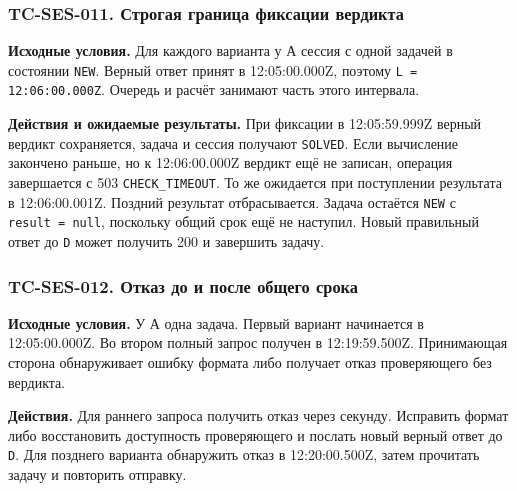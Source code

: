 \documentclass[12pt,a4paper]{article}
\begin{document}
\subsubsection{TC-SES-011. Строгая граница фиксации вердикта}\label{tc-ses-011-ux441ux442ux440ux43eux433ux430ux44f-ux433ux440ux430ux43dux438ux446ux430-ux444ux438ux43aux441ux430ux446ux438ux438-ux432ux435ux440ux434ux438ux43aux442ux430}

\hypertarget{tc-ses-011-строгая-граница-фиксации-вердикта}{}

\hypertarget{tc-ses-011}{}

\textbf{Исходные условия.} Для каждого варианта у А сессия с одной задачей в состоянии \texttt{NEW}. Верный ответ принят в 12:05:00.000Z, поэтому \texttt{L =\allowbreak{} 12:06:00.\allowbreak{}000Z}. Очередь и расчёт занимают часть этого интервала.

\textbf{Действия и ожидаемые результаты.} При фиксации в 12:05:59.999Z верный вердикт сохраняется, задача и сессия получают \texttt{SOLVED}. Если вычисление закончено раньше, но к 12:06:00.000Z вердикт ещё не записан, операция завершается с 503 \texttt{CHECK\_\allowbreak{}TIMEOUT}. То же ожидается при поступлении результата в 12:06:00.001Z. Поздний результат отбрасывается. Задача остаётся \texttt{NEW} с \texttt{result\ =\ null}, поскольку общий срок ещё не наступил. Новый правильный ответ до \texttt{D} может получить 200 и завершить задачу.

\subsubsection{TC-SES-012. Отказ до и после общего срока}\label{tc-ses-012-ux43eux442ux43aux430ux437-ux434ux43e-ux438-ux43fux43eux441ux43bux435-ux43eux431ux449ux435ux433ux43e-ux441ux440ux43eux43aux430}

\hypertarget{tc-ses-012-отказ-до-и-после-общего-срока}{}

\hypertarget{tc-ses-012}{}

\textbf{Исходные условия.} У А одна задача. Первый вариант начинается в 12:05:00.000Z. Во втором полный запрос получен в 12:19:59.500Z. Принимающая сторона обнаруживает ошибку формата либо получает отказ проверяющего без вердикта.

\textbf{Действия.} Для раннего запроса получить отказ через секунду. Исправить формат либо восстановить доступность проверяющего и послать новый верный ответ до \texttt{D}. Для позднего варианта обнаружить отказ в 12:20:00.500Z, затем прочитать задачу и повторить отправку.
\end{document}

